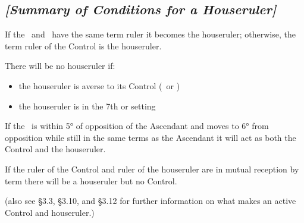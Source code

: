 \begin{mdframed}[backgroundcolor=cyan!5]
\subsection{\textit{[Summary of Conditions for a Houseruler]}}
If the \Sun\, and \Moon\, have the same term ruler it becomes the houseruler; otherwise, the term ruler of the Control is the houseruler.

\noindent There will be no houseruler if:
\vspace{-1em}
\begin{itemize}
\item the houseruler is averse to its Control (\Sun\, or \Moon)
\item the houseruler is in the 7th or setting
\end{itemize}

If the \Moon\, is within 5° of opposition of the Ascendant and moves to 6° from opposition while still in the same terms as the Ascendant it will act as both the Control and the houseruler.

If the ruler of the Control and ruler of the houseruler are in mutual reception by term there will be a houseruler but no Control.

(also see \S3.3, \S3.10, and \S3.12 for further information on what makes an active Control and houseruler.)
\end{mdframed}

\newpage